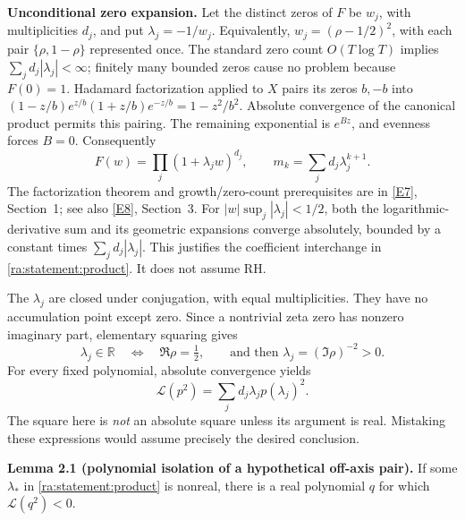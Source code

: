 \documentclass[11pt]{article}
\newcommand{\R}{\mathbb{R}}
\newcommand{\eref}[2]{\hyperlink{extra:#1:#2}{[E#2]}}
\begin{document}
\medskip
\textbf{Unconditional zero expansion.}
Let the distinct zeros of $F$ be $w_j$, with multiplicities $d_j$, and put
$\lambda_j=-1/w_j$. Equivalently, $w_j=(\rho-1/2)^2$, with each pair
$\{\rho,1-\rho\}$ represented once. The standard zero count
$O(T\log T)$ implies $\sum_jd_j|\lambda_j|<\infty$; finitely many bounded
zeros cause no problem because $F(0)=1$. Hadamard factorization applied to
$X$ pairs its zeros $b,-b$ into
$(1-z/b)e^{z/b}(1+z/b)e^{-z/b}=1-z^2/b^2$.
Absolute convergence of the canonical product permits this pairing.
The remaining exponential is $e^{Bz}$, and evenness forces $B=0$.
Consequently
\begin{equation}\label{ra:statement:product}
 F(w)=\prod_j(1+\lambda_jw)^{d_j},\qquad
 m_k=\sum_jd_j\lambda_j^{k+1}.
\end{equation}
The factorization theorem and growth/zero-count prerequisites are in
\eref{statement}{7}, Section~1; see also \eref{statement}{8}, Section~3.
For $|w|\sup_j|\lambda_j|<1/2$, both the logarithmic-derivative sum and
its geometric expansions converge absolutely, bounded by a constant times
$\sum_jd_j|\lambda_j|$. This justifies the coefficient interchange in
\eqref{ra:statement:product}. It does not assume RH.

The $\lambda_j$ are closed under conjugation, with equal multiplicities.
They have no accumulation point except zero. Since a nontrivial zeta zero
has nonzero imaginary part, elementary squaring gives
\begin{equation}\label{ra:statement:lambda-location}
 \lambda_j\in\R\quad\Longleftrightarrow\quad
 \Re\rho=\tfrac12,
 \qquad\text{and then }\lambda_j=(\Im\rho)^{-2}>0.
\end{equation}
For every fixed polynomial, absolute convergence yields
\begin{equation}\label{ra:statement:Lzero}
 \mathcal L(p^2)=\sum_j d_j\lambda_jp(\lambda_j)^2.
\end{equation}
The square here is \emph{not} an absolute square unless its argument is real.
Mistaking these expressions would assume precisely the desired conclusion.

\medskip
\textbf{Lemma 2.1 (polynomial isolation of a hypothetical off-axis pair).}
If some $\lambda_*$ in \eqref{ra:statement:product} is nonreal, there is a real
polynomial $q$ for which $\mathcal L(q^2)<0$.
\end{document}
